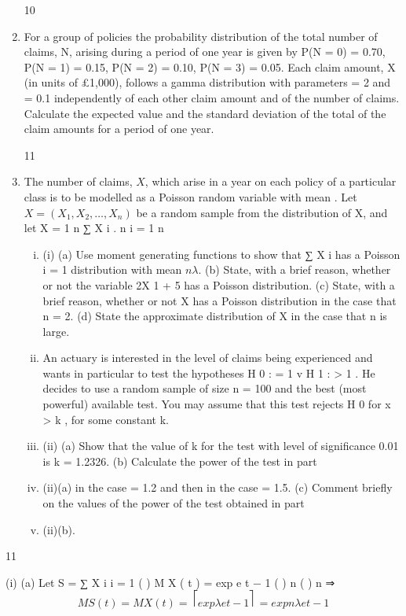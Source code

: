 \documentclass[a4paper,12pt]{article}
\begin{document}
\begin{enumerate}
10
\item For a group of policies the probability distribution of the total number of claims, N,
arising during a period of one year is given by
P(N = 0) = 0.70, P(N = 1) = 0.15, P(N = 2) = 0.10, P(N = 3) = 0.05.
Each claim amount, X (in units of £1,000), follows a gamma distribution with parameters \alpha = 2 and \lambda = 0.1 independently of each other claim amount and of the number of claims.
Calculate the expected value and the standard deviation of the total of the claim amounts for a period of one year.


11
\item The number of claims, $X$, which arise in a year on each policy of a particular class is to be modelled as a Poisson random variable with mean \lambda. Let $X = (X_1 , X_2 , \ldots, X_n )$ be a random sample from the distribution of X, and let X =
1 n
∑ X i .
n i = 1
n
\begin{enumerate}[(i)]
\item (i)
(a)
Use moment generating functions to show that
∑ X i has a Poisson
i = 1
distribution with mean $n\lambda$.
(b) State, with a brief reason, whether or not the variable 2X 1 + 5 has a Poisson distribution.
(c) State, with a brief reason, whether or not X has a Poisson distribution in the case that n = 2.
(d) State the approximate distribution of X in the case that n is large.
\item An actuary is interested in the level of claims being experienced and wants in particular to test the hypotheses
H 0 : \lambda = 1 v H 1 : \lambda > 1 .
He decides to use a random sample of size n = 100 and the best (most powerful) available test. You may assume that this test rejects H 0 for x > k , for some constant k.
\item (ii)
(a) Show that the value of k for the test with level of significance 0.01 is k = 1.2326.
(b) Calculate the power of the test in part \item (ii)(a) in the case \lambda = 1.2 and then in the case \lambda = 1.5.
(c) Comment briefly on the values of the power of the test obtained in part
\item (ii)(b).
\end{enumerate}
\end{enumerate}
\newpage

11
\item (i)
(a)
Let S = ∑ X i
i = 1
{ (
) }
M X ( t ) = exp \lambda e t − 1
{ (
) }
n
{ (
) }
n
⇒ \[M S ( t ) = { M X ( t ) } = ⎡ exp \lambda e t − 1 ⎤ = exp n \lambda e t − 1\]
\end{document}
